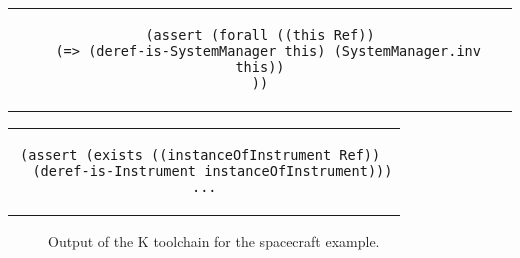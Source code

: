 \hline

\begin{center}
\begin{tabular}{c}
\begin{lstlisting}
(assert (forall ((this Ref))
  (=> (deref-is-SystemManager this) (SystemManager.inv this))
))
\end{lstlisting}
\end{tabular}
\end{center}

\hline

\begin{center}
\begin{tabular}{c}
\begin{lstlisting}
(assert (exists ((instanceOfInstrument Ref)) 
  (deref-is-Instrument instanceOfInstrument)))
...
\end{lstlisting}
\end{tabular}
\end{center}

\hline

\begin{figure}
\caption{Output of the K toolchain for the spacecraft example.}
\label{fig:shapes}
\end{figure}

\lstset{language=K}
